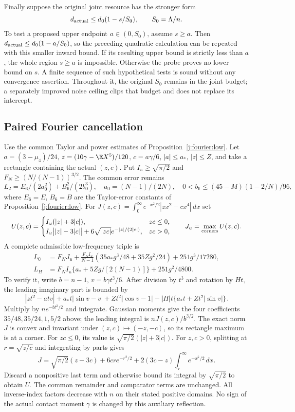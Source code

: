 Finally suppose the original joint resource has the stronger form
\[
 d_{\rm actual}\le d_0(1-s/S_0),\qquad S_0=\Lambda/n.
\]
To test a proposed upper endpoint $a\in(0,S_0)$, assume $s\ge a$.
Then $d_{\rm actual}\le d_0(1-a/S_0)$, so the preceding quadratic
calculation can be repeated with this smaller inward bound. If its
resulting upper bound is strictly less than $a$, the whole region
$s\ge a$ is impossible. Otherwise the probe proves no lower bound
on $s$. A finite sequence of such hypothetical tests is sound
without any convergence assertion. Throughout it, the original
$S_0$ remains in the joint budget; a separately improved noise
ceiling clips that budget and does not replace its intercept.


\subsection{Paired Fourier cancellation}
\label{j:local:paired}
Use the common Taylor and power estimates of Proposition~\ref{j:fourier:low}.
Let $a=(3-\mu_4)/24$, $z=(10\gamma-\E X^5)/120$, $c=a\gamma/6$,
$|a|\le a_*$, $|z|\le Z$, and take a rectangle containing the actual
$(z,c)$. Put $I_u\ge\sqrt{\pi/2}$ and
$F_N\ge(N/(N-1))^{3/2}$. The common error remains
\[
 L_2=E_6/(2a_0^2)+B_6^2/(2b_0^3),\quad
 a_0=(N-1)/(2N),\quad0<b_0\le(45-M)(1-2/N)/96,
\]
where $E_6=E$, $B_6=B$ are the Taylor-error constants of Proposition~\ref{j:fourier:low}.
For $J(z,c)=\int_0^\infty e^{-x^2/2}|zx^2-cx^4|\,dx$ set
\[
 U(z,c)=\begin{cases}I_u(|z|+3|c|),&zc\le0,\\
 I_u\bigl||z|-3|c|\bigr|+6\sqrt{|zc|}e^{-|z|/(2|c|)},&zc>0,
 \end{cases}\qquad J_u=\max_{\rm corners}U(z,c).
\]
A complete admissible low-frequency triple is
\begin{align}\label{j:local:fourier:paired}
 L_0&=F_NJ_u+\frac{F_NI_u}{N-1}
 (35a_*g^3/48+35Zg^2/24)+251g^3/17280,\\
 L_H&=F_NI_u\{a_*+5Zg/[2(N-1)]\}+251g^2/4800.\nonumber
\end{align}
To verify it, write $b=n-1$, $v=b\gamma t^3/6$. After division by $t^3$
and rotation by $Ht$, the leading imaginary part is bounded by
\[
 |zt^2-atv|+a_*t|\sin v-v|+Zt^2|\cos v-1|
 +|H|t\{a_*t+Zt^2|\sin v|\}.
\]
Multiply by $ne^{-bt^2/2}$ and integrate. Gaussian moments give the four
coefficients $35/48,35/24,1,5/2$ above; the leading integral is
$nJ(z,c)/b^{3/2}$. The exact norm $J$ is convex and invariant under
$(z,c)\mapsto(-z,-c)$, so its rectangle maximum is at a corner.
For $zc\le0$, its value is $\sqrt{\pi/2}(|z|+3|c|)$.
For $z,c>0$, splitting at $r=\sqrt{z/c}$ and integrating by parts gives
\[
 J=\sqrt{\pi/2}(z-3c)+6cr e^{-r^2/2}
       +2(3c-z)\int_r^\infty e^{-x^2/2}\,dx.
\]
Discard a nonpositive last term and otherwise bound its integral by
$\sqrt{\pi/2}$ to obtain $U$. The common remainder and comparator terms
are unchanged. All inverse-index factors decrease with $n$ on their
stated positive domains. No sign of the actual contact moment $\gamma$
is changed by this auxiliary reflection.


